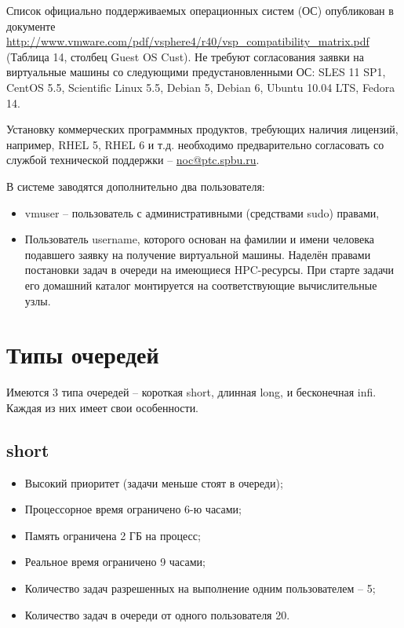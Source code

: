 \documentclass[a4paper,8pt]{extreport}
\begin{document}
Список официально поддерживаемых операционных систем (ОС) опубликован в документе 
\url{http://www.vmware.com/pdf/vsphere4/r40/vsp_compatibility_matrix.pdf}  (Таблица 14, столбец Guest OS Cust). 
Не требуют согласования заявки на виртуальные машины со следующими предустановленными ОС: 
SLES 11 SP1, CentOS 5.5, Scientific Linux 5.5, Debian 5, Debian 6, Ubuntu 10.04 LTS, Fedora 14.

Установку коммерческих программных продуктов, требующих наличия лицензий, например, 
RHEL 5, RHEL 6 и т.д. необходимо предварительно согласовать со службой технической поддержки -- \href{mailto:noc@ptc.spbu.ru}{noc@ptc.spbu.ru}.

В системе заводятся дополнительно два пользователя: 
\begin{itemize}
  \item vmuser -- пользователь с административными (средствами sudo) правами, 
  \item Пользователь username, которого основан на фамилии и имени человека подавшего заявку на получение 
  виртуальной машины. Наделён правами постановки задач в очереди на имеющиеся HPC-ресурсы. При старте задачи его 
домашний каталог монтируется на соответствующие вычислительные узлы.
\end{itemize}

\section{Типы очередей}
Имеются 3 типа очередей -- короткая short, длинная long, и бесконечная infi. Каждая из них имеет свои особенности.

\subsection{short}
\begin{itemize}
  \item Высокий приоритет (задачи меньше стоят в очереди);
  \item Процессорное время ограничено 6-ю часами;
  \item Память ограничена 2 ГБ на процесс;
  \item Реальное время ограничено 9 часами;
  \item Количество задач разрешенных на выполнение одним пользователем -- 5;
  \item Количество задач в очереди от одного пользователя 20.
\end{itemize}
\end{document}
